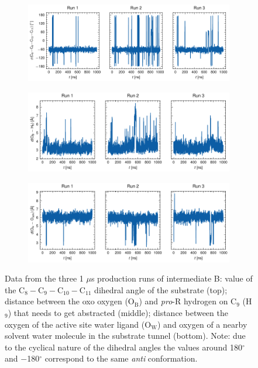 \begin{figure}[htbp]
    \centering
    \begin{subfigure}{\textwidth}
        \centering
        \includegraphics[width=\textwidth]{Figures/B_C9-C10_all.pdf}
    \end{subfigure}
    \par\bigskip
    \begin{subfigure}{\textwidth}
        \centering
        \includegraphics[width=\textwidth]{Figures/B_Ob-H9_all.pdf}
    \end{subfigure}
    \par\bigskip
    \begin{subfigure}{\textwidth}
        \centering
        \includegraphics[width=\textwidth]{Figures/B_Ow-Ow_all.pdf}
    \end{subfigure}
    \caption{Data from the three 1 $\mu$s production runs of intermediate B: value of the C$_8-$C$_9-$C$_{10}-$C$_{11}$ dihedral angle of the substrate (top); distance between the oxo oxygen (O$_{\text{B}}$) and \textit{pro}-R hydrogen on C$_9$ (H$_{9}$) that needs to get abstracted (middle); distance between the oxygen of the active site water ligand (O$_{\text{W}}$) and oxygen of a nearby solvent water molecule in the substrate tunnel (bottom). Note: due to the cyclical nature of the dihedral angles the values around 180$^{\circ}$ and $-$180$^{\circ}$ correspond to the same \textit{anti} conformation.}
    \label{fig:B_appendix}
\end{figure}

